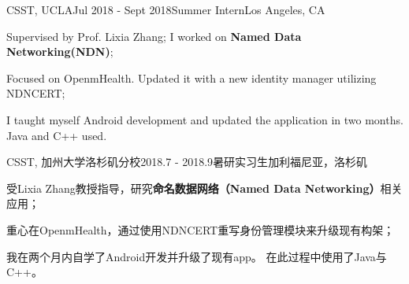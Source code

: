 \if\lang\eng
	\begin{rSubsection}{CSST, UCLA}{Jul 2018 - Sept 2018}{Summer Intern}{Los Angeles, CA}
		\item Supervised by Prof. Lixia Zhang; I worked on \textbf{Named Data Networking(NDN)};
		\item Focused on OpenmHealth. Updated it with a new identity manager utilizing NDNCERT;
		\item I taught myself Android development and updated the application in two months. Java and C++ used.
	\end{rSubsection}
\else
	\begin{rSubsection}{CSST, 加州大学洛杉矶分校}{2018.7 - 2018.9}{暑研实习生}{加利福尼亚，洛杉矶}
		\item 受Lixia Zhang教授指导，研究\textbf{命名数据网络（Named Data Networking）}相关应用；
		\item 重心在OpenmHealth，通过使用NDNCERT重写身份管理模块来升级现有构架；
		\item 我在两个月内自学了Android开发并升级了现有app。 在此过程中使用了Java与C++。
	\end{rSubsection}
\fi